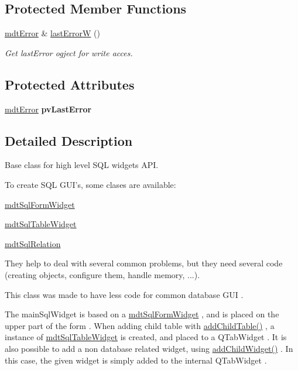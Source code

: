 \subsection*{Protected Member Functions}
\begin{DoxyCompactItemize}
\item 
\hyperlink{classmdt_error}{mdtError} \& \hyperlink{classmdt_sql_form_abee43c43913605ad585ad163b998fca4}{lastErrorW} ()
\begin{DoxyCompactList}\small\item\em Get lastError ogject for write acces. \end{DoxyCompactList}\end{DoxyCompactItemize}
\subsection*{Protected Attributes}
\begin{DoxyCompactItemize}
\item 
\hypertarget{classmdt_sql_form_afc24e8dedd1249a29708347fdff560fd}{
\hyperlink{classmdt_error}{mdtError} {\bfseries pvLastError}}
\label{classmdt_sql_form_afc24e8dedd1249a29708347fdff560fd}

\end{DoxyCompactItemize}


\subsection{Detailed Description}
Base class for high level SQL widgets API. 

To create SQL GUI's, some clases are available:
\begin{DoxyItemize}
\item \hyperlink{classmdt_sql_form_widget}{mdtSqlFormWidget}
\item \hyperlink{classmdt_sql_table_widget}{mdtSqlTableWidget}
\item \hyperlink{classmdt_sql_relation}{mdtSqlRelation}
\end{DoxyItemize}

They help to deal with several common problems, but they need several code (creating objects, configure them, handle memory, ...).

This class was made to have less code for common database GUI .

The mainSqlWidget is based on a \hyperlink{classmdt_sql_form_widget}{mdtSqlFormWidget} , and is placed on the upper part of the form . When adding child table with \hyperlink{classmdt_sql_form_a3504a54f26777ed38efce5cc151a1dbf}{addChildTable()} , a instance of \hyperlink{classmdt_sql_table_widget}{mdtSqlTableWidget} is created, and placed to a QTabWidget . It is also possible to add a non database related widget, using \hyperlink{classmdt_sql_form_a86174e002c2dd5496ab74a7eb67c614c}{addChildWidget()} . In this case, the given widget is simply added to the internal QTabWidget . 

